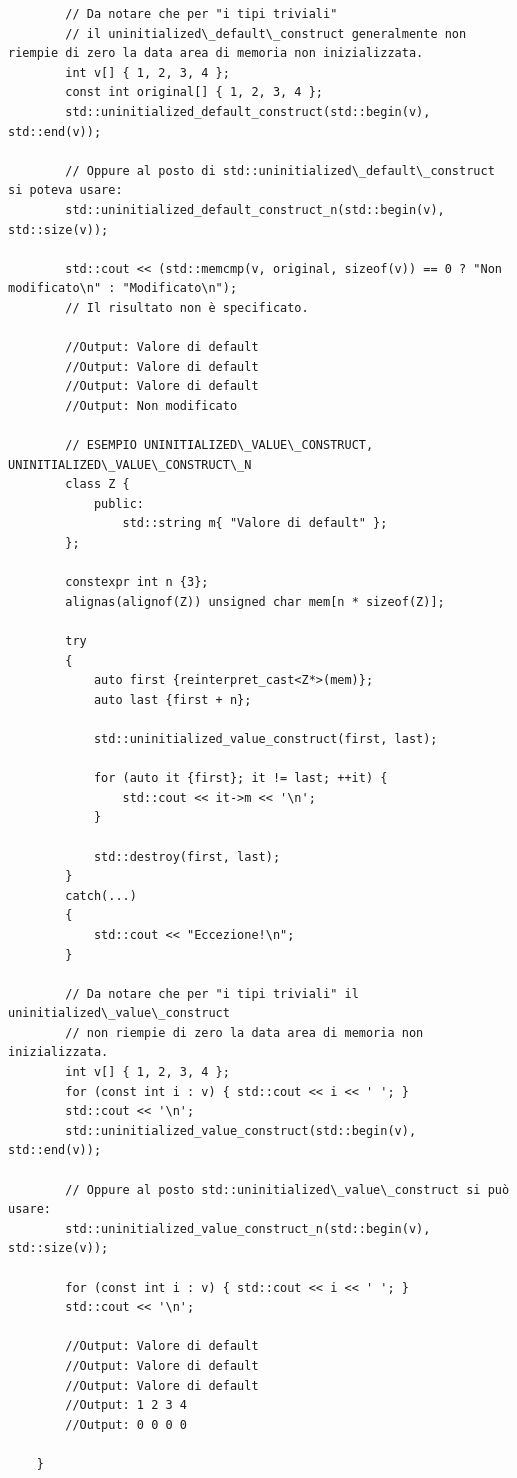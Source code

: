 \begin{lstlisting}
		// Da notare che per "i tipi triviali"
		// il uninitialized\_default\_construct generalmente non riempie di zero la data area di memoria non inizializzata.
		int v[] { 1, 2, 3, 4 };
		const int original[] { 1, 2, 3, 4 };
		std::uninitialized_default_construct(std::begin(v), std::end(v));
		
		// Oppure al posto di std::uninitialized\_default\_construct si poteva usare:
		std::uninitialized_default_construct_n(std::begin(v), std::size(v));
		
		std::cout << (std::memcmp(v, original, sizeof(v)) == 0 ? "Non modificato\n" : "Modificato\n");
		// Il risultato non è specificato.
		
		//Output: Valore di default
		//Output: Valore di default
		//Output: Valore di default
		//Output: Non modificato
		
		// ESEMPIO UNINITIALIZED\_VALUE\_CONSTRUCT, UNINITIALIZED\_VALUE\_CONSTRUCT\_N
		class Z { 
			public:
				std::string m{ "Valore di default" }; 
		};
		
		constexpr int n {3};
		alignas(alignof(Z)) unsigned char mem[n * sizeof(Z)];
		
		try
		{
			auto first {reinterpret_cast<Z*>(mem)};
			auto last {first + n};
			
			std::uninitialized_value_construct(first, last);
			
			for (auto it {first}; it != last; ++it) {
				std::cout << it->m << '\n';
			}
			
			std::destroy(first, last);
		}
		catch(...)
		{
			std::cout << "Eccezione!\n";
		}
		
		// Da notare che per "i tipi triviali" il uninitialized\_value\_construct
		// non riempie di zero la data area di memoria non inizializzata.
		int v[] { 1, 2, 3, 4 };
		for (const int i : v) { std::cout << i << ' '; }
		std::cout << '\n';
		std::uninitialized_value_construct(std::begin(v), std::end(v));
		
		// Oppure al posto std::uninitialized\_value\_construct si può usare:
		std::uninitialized_value_construct_n(std::begin(v), std::size(v));
		
		for (const int i : v) { std::cout << i << ' '; }
		std::cout << '\n';
		
		//Output: Valore di default
		//Output: Valore di default
		//Output: Valore di default
		//Output: 1 2 3 4 
		//Output: 0 0 0 0
		
	}
\end{lstlisting}



